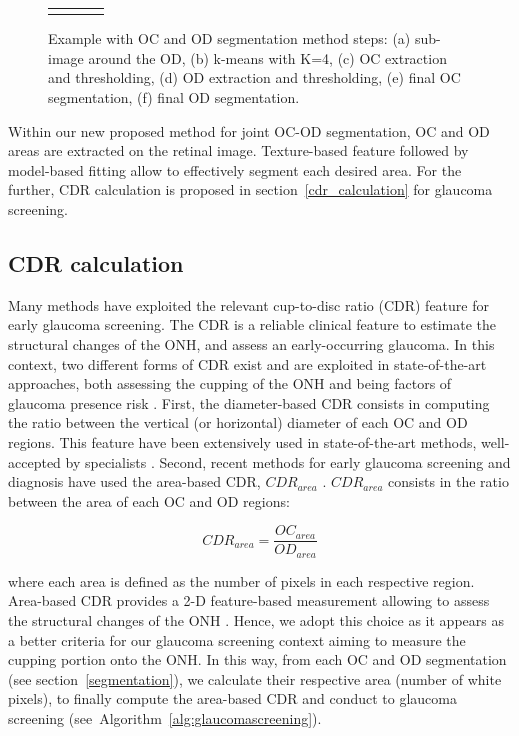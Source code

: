 \begin{figure}[t]
\begin{tabular}{p{2.5cm} p{2.5cm} p{2.5cm} p{2.5cm}}
        {} & {} & {} & {} \\
    
    \end{tabular}
    
    \caption{\label{etapes_segmentation}Example with OC and OD segmentation method steps: (a) sub-image around the OD, (b) k-means with K=4, (c) OC extraction and thresholding, (d) OD extraction and thresholding, (e) final OC segmentation, (f) final OD segmentation.}
    
\end{figure}


Within our new proposed method for joint OC-OD segmentation, OC and OD areas are extracted on the retinal image. Texture-based feature followed by model-based fitting allow to effectively segment each desired area. For the further, CDR calculation is proposed in \mbox{section \ref{cdr_calculation}} for glaucoma screening.

\subsection{\label{cdr_calculation}CDR calculation}

Many methods have exploited the relevant cup-to-disc ratio (CDR) feature for early glaucoma screening. The CDR is a reliable clinical feature to estimate the structural changes of the ONH, and assess an early-occurring glaucoma. In this context, two different forms of CDR exist and are exploited in state-of-the-art approaches, both assessing the cupping of the ONH and being factors of glaucoma presence risk \citep{cdr}.
First, the diameter-based CDR consists in computing the ratio between the vertical (or horizontal) diameter of each OC and OD regions. This feature have been extensively used in state-of-the-art methods, well-accepted by specialists \citep{cheng}.
Second, recent methods for early glaucoma screening and diagnosis have used the area-based CDR, $CDR_{area}$ \citep{nugraha, priyadharsini}. $CDR_{area}$ consists in the ratio between the area of each OC and OD regions:

\begin{equation}
    CDR_{area} = \frac{OC_{area}}{OD_{area}}
\end{equation}

\noindent where each area is defined as the number of pixels in each respective region. Area-based CDR provides a 2-D feature-based measurement allowing to assess the structural changes of the ONH \citep{maldhure}.  Hence, we adopt this choice as it appears as a better criteria for our glaucoma screening context aiming to measure the cupping portion onto the ONH. In this way, from each OC and OD segmentation (see \mbox{section \ref{segmentation}}), we calculate their respective area (number of white pixels), to finally compute the area-based CDR and conduct to glaucoma screening \mbox{(see Algorithm~\ref{alg:glaucomascreening})}.

